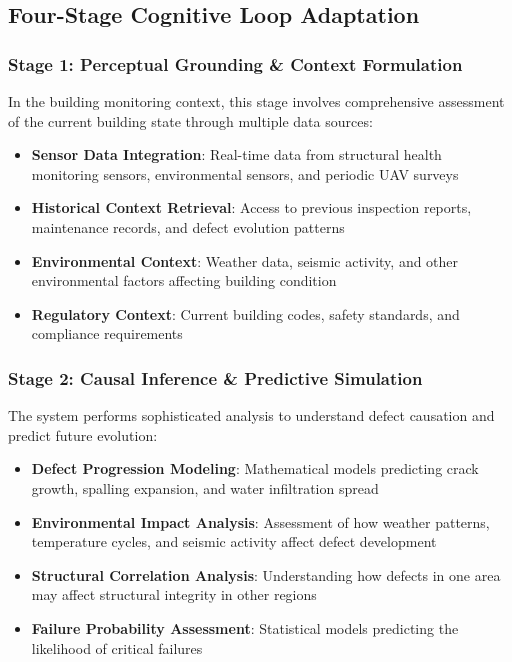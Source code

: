 \subsection{Four-Stage Cognitive Loop Adaptation}

\subsubsection{Stage 1: Perceptual Grounding \& Context Formulation}

In the building monitoring context, this stage involves comprehensive assessment of the current building state through multiple data sources:

\begin{itemize}
    \item \textbf{Sensor Data Integration}: Real-time data from structural health monitoring sensors, environmental sensors, and periodic UAV surveys
    \item \textbf{Historical Context Retrieval}: Access to previous inspection reports, maintenance records, and defect evolution patterns
    \item \textbf{Environmental Context}: Weather data, seismic activity, and other environmental factors affecting building condition
    \item \textbf{Regulatory Context}: Current building codes, safety standards, and compliance requirements
\end{itemize}

\subsubsection{Stage 2: Causal Inference \& Predictive Simulation}

The system performs sophisticated analysis to understand defect causation and predict future evolution:

\begin{itemize}
    \item \textbf{Defect Progression Modeling}: Mathematical models predicting crack growth, spalling expansion, and water infiltration spread
    \item \textbf{Environmental Impact Analysis}: Assessment of how weather patterns, temperature cycles, and seismic activity affect defect development
    \item \textbf{Structural Correlation Analysis}: Understanding how defects in one area may affect structural integrity in other regions
    \item \textbf{Failure Probability Assessment}: Statistical models predicting the likelihood of critical failures
\end{itemize}


